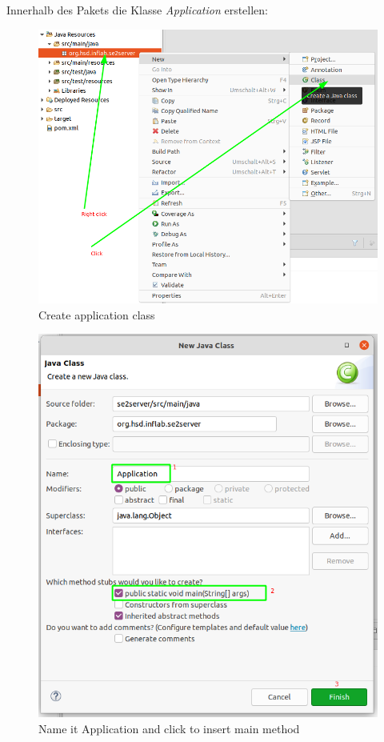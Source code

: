 \documentclass[11pt]{scrartcl}
\begin{document}
\newpage
Innerhalb des Pakets die Klasse \textit{Application} erstellen:
\begin{figure}[!ht]
    \includegraphics[width=\linewidth]{images/eclipse09_create_application_class.png}
    \caption{Create application class}
    \label{fig:createapplicationclass}
\end{figure}

\newpage
\begin{figure}[!ht]
    \includegraphics[width=\linewidth]{images/eclipse10_create_application_class2.png}
    \caption{Name it Application and click to insert main method}
    \label{fig:createapplicationclass2}
\end{figure}
\end{document}
